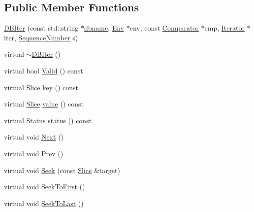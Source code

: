 \subsection*{Public Member Functions}
\begin{DoxyCompactItemize}
\item 
\hyperlink{classleveldb_1_1anonymous__namespace_02db__iter_8cc_03_1_1_d_b_iter_a428dc7bcad22ac9a6e61855215a28e40}{D\+B\+Iter} (const std\+::string $\ast$\hyperlink{c__test_8c_a75d845559336df6843f3b599960f89d2}{dbname}, \hyperlink{classleveldb_1_1_env}{Env} $\ast$env, const \hyperlink{structleveldb_1_1_comparator}{Comparator} $\ast$cmp, \hyperlink{classleveldb_1_1_iterator}{Iterator} $\ast$iter, \hyperlink{namespaceleveldb_a5481ededd221c36d652c371249f869fa}{Sequence\+Number} s)
\item 
virtual \hyperlink{classleveldb_1_1anonymous__namespace_02db__iter_8cc_03_1_1_d_b_iter_a5c2dfcfef34b3d43a2329c4a0b224ff5}{$\sim$\+D\+B\+Iter} ()
\item 
virtual bool \hyperlink{classleveldb_1_1anonymous__namespace_02db__iter_8cc_03_1_1_d_b_iter_afb59f11fbf9feb083f5144023e598991}{Valid} () const 
\item 
virtual \hyperlink{classleveldb_1_1_slice}{Slice} \hyperlink{classleveldb_1_1anonymous__namespace_02db__iter_8cc_03_1_1_d_b_iter_a3553118d800278eb9ab467c64de063a6}{key} () const 
\item 
virtual \hyperlink{classleveldb_1_1_slice}{Slice} \hyperlink{classleveldb_1_1anonymous__namespace_02db__iter_8cc_03_1_1_d_b_iter_a1ec1d37cc4efbfcd0ecc2dfd9d1881c4}{value} () const 
\item 
virtual \hyperlink{classleveldb_1_1_status}{Status} \hyperlink{classleveldb_1_1anonymous__namespace_02db__iter_8cc_03_1_1_d_b_iter_aaf4ed1cad19fb5fe6cc20ca80fbbced1}{status} () const 
\item 
virtual void \hyperlink{classleveldb_1_1anonymous__namespace_02db__iter_8cc_03_1_1_d_b_iter_af75033acd508d52aaf43987fa9ffe194}{Next} ()
\item 
virtual void \hyperlink{classleveldb_1_1anonymous__namespace_02db__iter_8cc_03_1_1_d_b_iter_a57bffd756f2824a053e9c95d793e815e}{Prev} ()
\item 
virtual void \hyperlink{classleveldb_1_1anonymous__namespace_02db__iter_8cc_03_1_1_d_b_iter_af213fc2538e3b6002704e465bf0b74a2}{Seek} (const \hyperlink{classleveldb_1_1_slice}{Slice} \&target)
\item 
virtual void \hyperlink{classleveldb_1_1anonymous__namespace_02db__iter_8cc_03_1_1_d_b_iter_a7960f352be2648eb7822201b4594baf5}{Seek\+To\+First} ()
\item 
virtual void \hyperlink{classleveldb_1_1anonymous__namespace_02db__iter_8cc_03_1_1_d_b_iter_a9357ea6d3c8d3c12b11306a154fbf1bb}{Seek\+To\+Last} ()
\end{DoxyCompactItemize}
